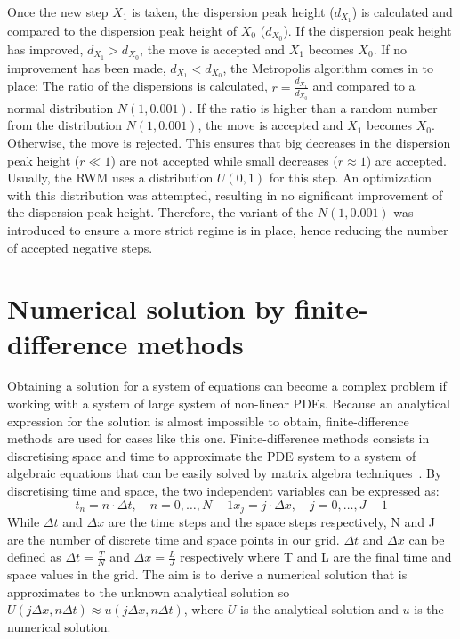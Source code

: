 Once the new step $X_{1}$ is taken, the dispersion peak height ($d_{X_{1}}$) is calculated and compared to the dispersion peak height  of $X_{0}$ ($d_{X_{0}}$). If the dispersion peak height has improved, $d_{X_{1}} > d_{X_{0}}$, the move is accepted and $X_{1}$ becomes $X_{0}$.
If no improvement has been made, $d_{X_{1}} < d_{X_{0}}$, the Metropolis algorithm comes in to place: The ratio of the dispersions is calculated, $r = \frac{d_{X_{1}}}{d_{X_{0}}}$  and compared to a normal distribution $N(1,0.001)$.
If the ratio is higher than a random number from the distribution $N(1,0.001)$, the move is accepted and $X_{1}$ becomes $X_{0}$.
Otherwise, the move is rejected.
This ensures that big decreases in the dispersion peak height ($r \ll 1$) are not accepted while small decreases ($r \approx 1$)  are accepted.
Usually, the RWM uses a distribution $U(0,1)$ for this step.
An optimization with this distribution was attempted, resulting in no significant improvement of the dispersion peak height.
Therefore, the variant of the $N(1,0.001) $ was introduced to ensure a more strict regime is in place, hence reducing the number of accepted negative steps.


\section{Numerical solution by finite-difference methods}
Obtaining a solution for a system of equations can become a complex problem if working with a system of large system of non-linear PDEs.
Because an analytical expression for the solution is almost impossible to obtain, finite-difference methods are used for cases like this one.
Finite-difference methods consists in discretising space and time to approximate the PDE system to a system of algebraic equations that can be easily solved by matrix algebra techniques~\parencite{Morton1994}.
By discretising time and space, the two independent variables can be expressed as:
\begin{subequations}
    \begin{equation}
        t_{n} = n \cdot \Delta t, \quad n=0,\dots,N-1
    \end{equation}
    \begin{equation}
        x_{j} = j \cdot \Delta x, \quad j=0, \dots,J-1
    \end{equation}
\end{subequations}
While $\Delta t$ and $\Delta x$ are the time steps and the space steps respectively, N and J are the number of discrete time and space points in our grid.
$\Delta t$ and $\Delta x$ can be defined as $ \Delta t = \frac{T}{N}$ and $\Delta x= \frac{L}{J}$ respectively where T and L are the final time and space values in the grid.
The aim is to derive a numerical solution that is approximates to the unknown analytical solution so $U(j\Delta x, n\Delta t)\approx u( j\Delta x, n\Delta t)$, where $U$ is the analytical solution and $u$ is the numerical solution.

